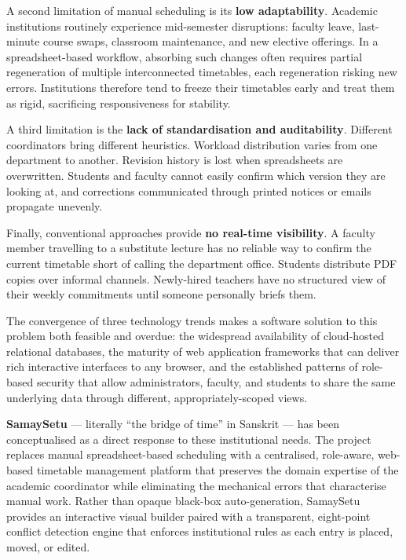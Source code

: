 A second limitation of manual scheduling is its \textbf{low adaptability}. Academic institutions routinely experience mid-semester disruptions: faculty leave, last-minute course swaps, classroom maintenance, and new elective offerings. In a spreadsheet-based workflow, absorbing such changes often requires partial regeneration of multiple interconnected timetables, each regeneration risking new errors. Institutions therefore tend to freeze their timetables early and treat them as rigid, sacrificing responsiveness for stability.

A third limitation is the \textbf{lack of standardisation and auditability}. Different coordinators bring different heuristics. Workload distribution varies from one department to another. Revision history is lost when spreadsheets are overwritten. Students and faculty cannot easily confirm which version they are looking at, and corrections communicated through printed notices or emails propagate unevenly.

Finally, conventional approaches provide \textbf{no real-time visibility}. A faculty member travelling to a substitute lecture has no reliable way to confirm the current timetable short of calling the department office. Students distribute PDF copies over informal channels. Newly-hired teachers have no structured view of their weekly commitments until someone personally briefs them.

The convergence of three technology trends makes a software solution to this problem both feasible and overdue: the widespread availability of cloud-hosted relational databases, the maturity of web application frameworks that can deliver rich interactive interfaces to any browser, and the established patterns of role-based security that allow administrators, faculty, and students to share the same underlying data through different, appropriately-scoped views.

\textbf{SamaySetu} --- literally ``the bridge of time'' in Sanskrit --- has been conceptualised as a direct response to these institutional needs. The project replaces manual spreadsheet-based scheduling with a centralised, role-aware, web-based timetable management platform that preserves the domain expertise of the academic coordinator while eliminating the mechanical errors that characterise manual work. Rather than opaque black-box auto-generation, SamaySetu provides an interactive visual builder paired with a transparent, eight-point conflict detection engine that enforces institutional rules as each entry is placed, moved, or edited.

